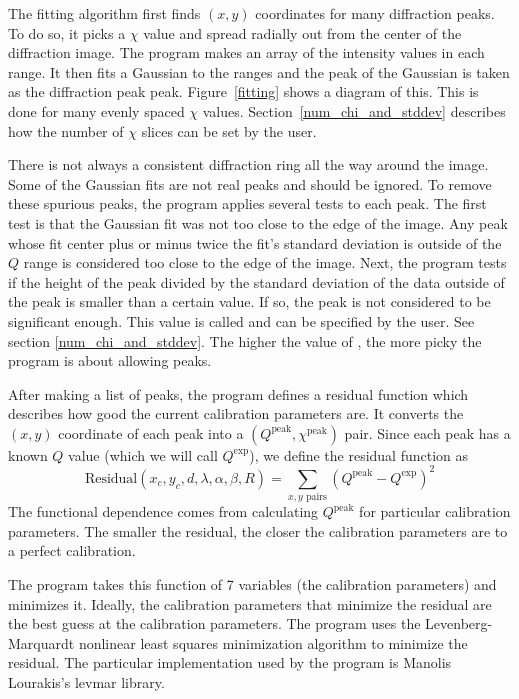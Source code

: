 The fitting algorithm first
finds $(x,y)$ coordinates for many diffraction peaks. 
To do so, it picks a $\chi$ value and 
spread radially out from the center of the diffraction
image. The program makes an array of the intensity
values in each range. It then fits a Gaussian to 
the ranges and the peak of the Gaussian is taken as
the diffraction peak peak. Figure~\ref{fitting} shows
a diagram of this. This is done for many evenly spaced 
$\chi$ values. 
Section~\ref{num_chi_and_stddev} describes how the
number of $\chi$ slices can be set by the user. 

There is not always a consistent diffraction ring 
all the way around the image. Some of the Gaussian fits are
not real peaks and should be ignored. To remove these
spurious peaks, the program applies several tests
to each peak. The first test is that the Gaussian fit was
not too close to the edge of the image. Any peak whose 
fit center plus or minus twice the fit's
standard deviation is outside of the $Q$ range is
considered too close to the edge of the image.
Next, the program tests if the height of the peak 
divided by the standard deviation of the data outside
of the peak is smaller than a certain value. If so,
the peak is not considered to be significant enough.
This value is called  and can be specified 
by the user. See section \ref{num_chi_and_stddev}.
The higher the value of , the
more picky the program is about allowing peaks. 

After making a list of peaks, the program defines a residual 
function which describes how good the current calibration
parameters are. It converts the $(x,y)$ coordinate
of each peak into a $(Q^{\text{peak}},\chi^{\text{peak}})$ 
pair. Since each peak has a known $Q$ value (which we will 
call $Q^{\text{exp}}$), we define the residual function as
\begin{equation}\label{residual}
    \text{Residual}(x_c,y_c,d,\lambda,\alpha,\beta,R) =  
        \sum_{\text{$x,y$ pairs}}
        (Q^{\text{peak}} - Q^{\text{exp}})^2
\end{equation}
The functional dependence comes from
calculating $Q^{\text{peak}}$ for particular
calibration parameters.
The smaller the residual, the closer the 
calibration parameters are to 
a perfect calibration.

The program takes this function of 7 variables (the
calibration parameters) and minimizes it. 
Ideally, the calibration parameters that minimize the 
residual are the best guess at the calibration parameters.
The program uses the Levenberg-Marquardt nonlinear 
least squares minimization algorithm to minimize the residual. 
The particular implementation used by the program
is Manolis Lourakis's
levmar library\cite{lourakis04LM}. 

